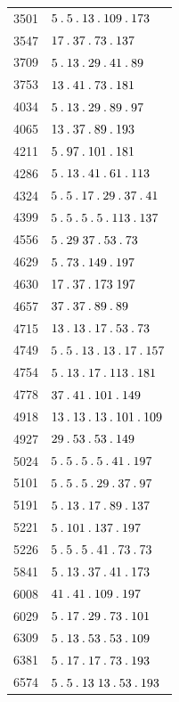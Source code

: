 \begin{longtable}{@{}r|l@{}}
3501 & $5\mathbin{.} 5\mathbin{.} 13\mathbin{.} 109\mathbin{.} 173$\\
3547 & $17\mathbin{.} 37\mathbin{.} 73\mathbin{.} 137$\\
3709 & $5\mathbin{.} 13\mathbin{.} 29\mathbin{.} 41\mathbin{.} 89$\\
3753 & $13\mathbin{.} 41\mathbin{.} 73\mathbin{.} 181$\\
4034 & $5\mathbin{.} 13\mathbin{.} 29\mathbin{.} 89\mathbin{.} 97$\\
4065 & $13\mathbin{.} 37\mathbin{.} 89\mathbin{.} 193$\\
4211 & $5\mathbin{.} 97\mathbin{.} 101\mathbin{.} 181$\\
4286 & $5\mathbin{.} 13\mathbin{.} 41\mathbin{.} 61\mathbin{.} 113$\\
4324 & $5\mathbin{.} 5\mathbin{.} 17\mathbin{.} 29\mathbin{.} 37\mathbin{.} 41$\\
4399 & $5\mathbin{.} 5\mathbin{.} 5\mathbin{.} 5\mathbin{.} 113\mathbin{.} 137$\\
4556 & $5\mathbin{.} 29\;37\mathbin{.} 53\mathbin{.} 73$\\
4629 & $5\mathbin{.} 73\mathbin{.} 149\mathbin{.} 197$\\
4630 & $17\mathbin{.} 37\mathbin{.} 173\;197$\\
4657 & $37\mathbin{.} 37\mathbin{.} 89\mathbin{.} 89$\\
4715 & $13\mathbin{.} 13\mathbin{.} 17\mathbin{.} 53\mathbin{.} 73$\\
4749 & $5\mathbin{.} 5\mathbin{.} 13\mathbin{.} 13\mathbin{.} 17\mathbin{.} 157$\\
4754 & $5\mathbin{.} 13\mathbin{.} 17\mathbin{.} 113\mathbin{.} 181$\\
4778 & $37\mathbin{.} 41\mathbin{.} 101\mathbin{.} 149$\\
4918 & $13\mathbin{.} 13\mathbin{.} 13\mathbin{.} 101\mathbin{.} 109$\\
4927 & $29\mathbin{.} 53\mathbin{.} 53\mathbin{.} 149$\\
5024 & $5\mathbin{.} 5\mathbin{.} 5\mathbin{.} 5\mathbin{.} 41\mathbin{.} 197$\\
5101 & $5\mathbin{.} 5\mathbin{.} 5\mathbin{.} 29\mathbin{.} 37\mathbin{.} 97$\\
5191 & $5\mathbin{.} 13\mathbin{.} 17\mathbin{.} 89\mathbin{.} 137$\\
5221 & $5\mathbin{.} 101\mathbin{.} 137\mathbin{.} 197$\\
5226 & $5\mathbin{.} 5\mathbin{.} 5\mathbin{.} 41\mathbin{.} 73\mathbin{.} 73$\\
5841 & $5\mathbin{.} 13\mathbin{.} 37\mathbin{.} 41\mathbin{.} 173$\\
6008 & $41\mathbin{.} 41\mathbin{.} 109\mathbin{.} 197$\\
6029 & $5\mathbin{.} 17\mathbin{.} 29\mathbin{.} 73\mathbin{.} 101$\\
6309 & $5\mathbin{.} 13\mathbin{.} 53\mathbin{.} 53\mathbin{.} 109$\\
6381 & $5\mathbin{.} 17\mathbin{.} 17\mathbin{.} 73\mathbin{.} 193$\\
6574 & $5\mathbin{.} 5\mathbin{.} 13\;13\mathbin{.} 53\mathbin{.} 193$\\

\end{longtable}
